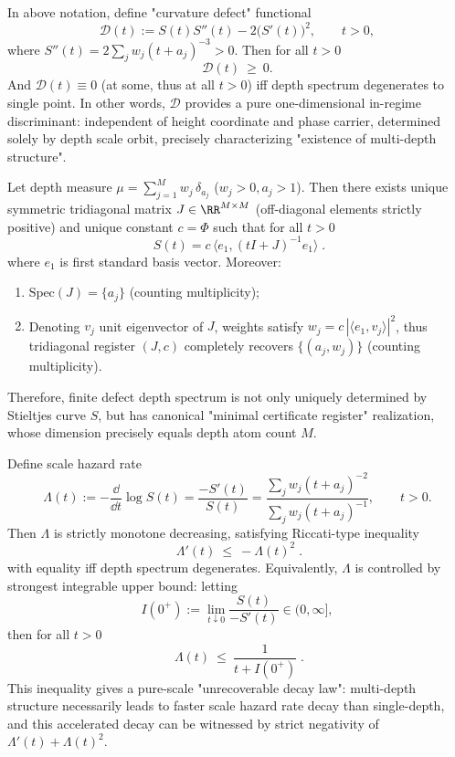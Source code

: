 \begin{proposition}
In above notation, define "curvature defect" functional
\[
\mathcal{D}(t):=S(t)S''(t)-2\bigl(S'(t)\bigr)^2,
\qquad t>0,
\]
where
\(
S''(t)=2\sum_{j}w_j(t+a_j)^{-3}>0
\).
Then for all \(t>0\)
\[
\boxed{\;\mathcal{D}(t)\ \ge\ 0.\;}
\]
And \(\mathcal{D}(t)\equiv 0\) (at some, thus at all \(t>0\)) iff depth spectrum degenerates to single point.
In other words, \(\mathcal{D}\) provides a pure one-dimensional in-regime discriminant: independent of height coordinate and phase carrier, determined solely by depth scale orbit, precisely characterizing "existence of multi-depth structure".
\end{proposition}

\begin{proposition}
Let depth measure \(\mu=\sum_{j=1}^{M} w_j\,\delta_{a_j}\) (\(w_j>0,a_j>1\)).
Then there exists unique symmetric tridiagonal matrix \(J\in\RR^{M\times M}\) (off-diagonal elements strictly positive) and unique constant \(c=\Phi\) such that for all \(t>0\)
\[
\boxed{\;
S(t)=c\,\langle e_1,(tI+J)^{-1}e_1\rangle\; }.
\]
where \(e_1\) is first standard basis vector.
Moreover:
\begin{enumerate}
  \item \( \mathrm{Spec}(J)=\{a_j\}\) (counting multiplicity);
  \item Denoting \(v_j\) unit eigenvector of \(J\), weights satisfy \(w_j=c\,|\langle e_1,v_j\rangle|^2\), thus tridiagonal register \((J,c)\) completely recovers \(\{(a_j,w_j)\}\) (counting multiplicity).
\end{enumerate}
Therefore, finite defect depth spectrum is not only uniquely determined by Stieltjes curve \(S\), but has canonical "minimal certificate register" realization, whose dimension precisely equals depth atom count \(M\).
\end{proposition}

\begin{proposition}[Hazard Rate Riccati Inequality: Strong Decay and Degeneracy Characterization of \texorpdfstring{$\Lambda(t):=-S'(t)/S(t)$}{Lambda(t)}]
Define scale hazard rate
\[
\Lambda(t):=-\frac{\dd}{\dd t}\log S(t)=\frac{-S'(t)}{S(t)}
=\frac{\sum_{j} w_j(t+a_j)^{-2}}{\sum_{j} w_j(t+a_j)^{-1}},
\qquad t>0.
\]
Then \(\Lambda\) is strictly monotone decreasing, satisfying Riccati-type inequality
\[
\boxed{\;
\Lambda'(t)\ \le\ -\Lambda(t)^2\; }.
\]
with equality iff depth spectrum degenerates.
Equivalently, \(\Lambda\) is controlled by strongest integrable upper bound: letting
\[
I(0^+):=\lim_{t\downarrow 0}\frac{S(t)}{-S'(t)}\in(0,\infty],
\]
then for all \(t>0\)
\[
\boxed{\;
\Lambda(t)\ \le\ \frac{1}{t+I(0^+)}\; }.
\]
This inequality gives a pure-scale "unrecoverable decay law": multi-depth structure necessarily leads to faster scale hazard rate decay than single-depth, and this accelerated decay can be witnessed by strict negativity of \(\Lambda'(t)+\Lambda(t)^2\).
\end{proposition}

